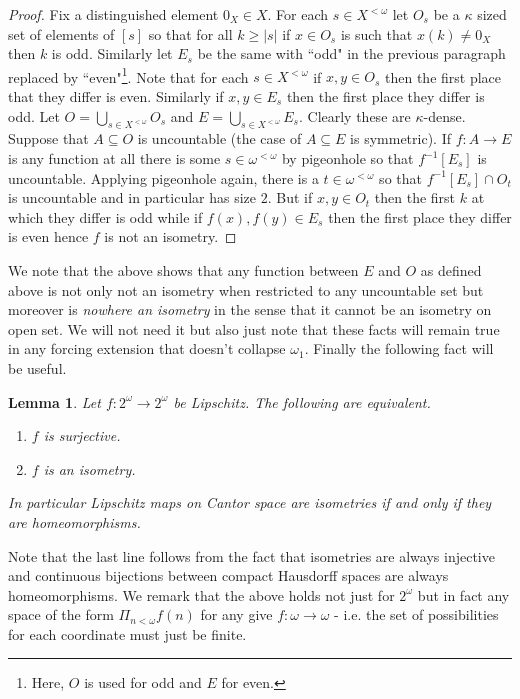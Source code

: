 \documentclass[leqno,11pt]{amsart}
\newtheorem{lemma}[theorem]{Lemma}
\theoremstyle{definition}
\theoremstyle{remark}
\def\cantor{2^\omega}
\begin{document}
\begin{proof}
     Fix a distinguished element $0_X \in X$. For each $s \in X^{<\omega}$ let $O_s$ be a $\kappa$ sized set of elements of $[s]$ so that for all $k \geq|s|$ if $x \in O_s$ is such that $x(k) \neq 0_X$ then $k$ is odd. Similarly let $E_s$ be the same with ``odd" in the previous paragraph replaced by ``even"\footnote{Here, $O$ is used for odd and $E$ for even.}. Note that for each $s \in X^{<\omega}$ if $x, y \in O_s$ then the first place that they differ is even. Similarly if $x, y \in E_s$ then the first place they differ is odd. Let $O = \bigcup_{s \in X^{<\omega}} O_s$ and $E = \bigcup_{s \in X^{<\omega}} E_s$. Clearly these are $\kappa$-dense. Suppose that $A \subseteq O$ is uncountable (the case of $A \subseteq E$ is symmetric). If $f:A \to E$ is any function at all there is some $s \in \omega^{<\omega}$ by pigeonhole so that $f^{-1}[E_s]$ is uncountable. Applying pigeonhole again, there is a $t \in \omega^{<\omega}$ so that $f^{-1}[E_s] \cap O_t$ is uncountable and in particular has size $2$. But if $x, y \in O_t$ then the first $k$ at which they differ is odd while if $f(x), f(y) \in E_s$ then the first place they differ is even hence $f$ is not an isometry. 
\end{proof}

We note that the above shows that any function between $E$ and $O$ as defined above is not only not an isometry when restricted to any uncountable set but moreover is {\em nowhere an isometry} in the sense that it cannot be an isometry on open set. We will not need it but also just note that these facts will remain true in any forcing extension that doesn't collapse $\omega_1$. Finally the following fact will be useful.
\begin{lemma} 
    Let $f:2^\omega \to 2^\omega$ be Lipschitz. The following are equivalent.

    \begin{enumerate}
        \item $f$ is surjective.
        \item $f$ is an isometry.
    \end{enumerate}

    In particular Lipschitz maps on Cantor space are isometries if and only if they are homeomorphisms. \label{nowhereisometriesareneversurjective}
\end{lemma}

Note that the last line follows from the fact that isometries are always injective and continuous bijections between compact Hausdorff spaces are always homeomorphisms. We remark that the above holds not just for $\cantor$ but in fact any space of the form $\Pi_{n < \omega} f(n)$ for any give $f:\omega \to \omega$ - i.e. the set of possibilities for each coordinate must just be finite. 
\end{document}
